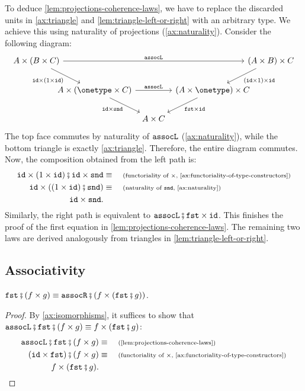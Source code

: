 To deduce \cref{lem:projections-coherence-laws}, we have to replace the discarded units in \cref{ax:triangle} and \cref{lem:triangle-left-or-right} with an arbitrary type. We achieve this using naturality of projections (\cref{ax:naturality}). Consider the following diagram:
\[
\begin{tikzcd}
    A \times \left(B \times C \right) 
    \ar[rrrr, "\assoclterm"]
    \ar[dr, "{\idterm \times \left( 1 \times \idterm \right)}"']
    &[-3.5em]&[-2em]&[-2em]&[-3.5em]\left( A \times B \right) \times C
    \ar[dl, "{\left( \idterm \times 1 \right) \times \idterm}"] 
    \\ 
    &A \times \left( \onetype \times C \right) 
    \ar[rr, "\assoclterm"]
    \ar[dr, "{\idterm \times \sndterm}"']
    &&\left( A \times \onetype \right) \times C 
    \ar[dl, "{\fstterm \times \idterm}"]
    \\ 
    &&A \times C
\end{tikzcd}
\]
The top face commutes by naturality of $\mathtt{assocL}$ (\cref{ax:naturality}), while the bottom triangle is exactly \cref{ax:triangle}. Therefore, the entire diagram commutes. Now, the composition obtained from the left path is:
\begin{align*}
    \idterm \times (1 \times \idterm) \comp \idterm \times \sndterm \equalbecause{functoriality of $\times$, \cref{ax:functoriality-of-type-constructors}} \\ 
    \idterm \times \left( \left(1 \times \idterm \right) \comp \sndterm \right) \equalbecause{naturality of $\sndterm$, \cref{ax:naturality}} \\ 
    \idterm \times \sndterm.
\end{align*}
Similarly, the right path is equivalent to $\assoclterm \comp \fstterm \times \idterm$. This finishes the proof of the first equation in \cref{lem:projections-coherence-laws}. The remaining two laws are derived analogously from triangles in \cref{lem:triangle-left-or-right}.

\subsection{Associativity}

\begin{lemma}\label{lem:assocr-fst-mapped-coherence}
    $\fstterm \comp (f \times g) \equiv \assocrterm \comp (f \times (\fstterm \comp g))$.
\end{lemma}
\begin{proof}
    By \cref{ax:isomorphisms}, it suffices to show that $\assoclterm \comp \fstterm \comp (f \times g) \equiv f \times (\fstterm \comp g)$:
    \begin{align*}
        \assoclterm \comp \fstterm \comp (f \times g) \equalbecause{\cref{lem:projections-coherence-laws}} \\ 
        (\idterm \times \fstterm) \comp (f \times g) \equalbecause{functoriality of $\times$, \cref{ax:functoriality-of-type-constructors}} \\ 
        f \times (\fstterm \comp g).
    \end{align*}
\end{proof}

